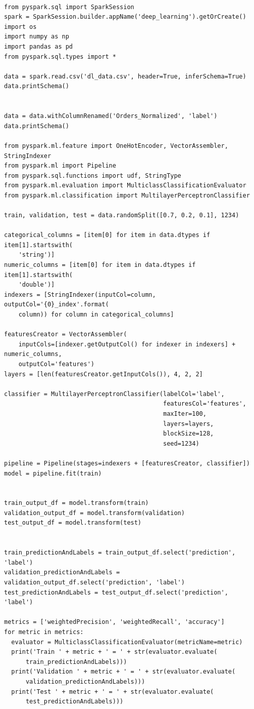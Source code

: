 \documentclass{article}
\begin{document}
\begin{lstlisting}

from pyspark.sql import SparkSession
spark = SparkSession.builder.appName('deep_learning').getOrCreate()
import os
import numpy as np
import pandas as pd
from pyspark.sql.types import *

data = spark.read.csv('dl_data.csv', header=True, inferSchema=True)
data.printSchema()


data = data.withColumnRenamed('Orders_Normalized', 'label')
data.printSchema()

from pyspark.ml.feature import OneHotEncoder, VectorAssembler, StringIndexer
from pyspark.ml import Pipeline
from pyspark.sql.functions import udf, StringType
from pyspark.ml.evaluation import MulticlassClassificationEvaluator
from pyspark.ml.classification import MultilayerPerceptronClassifier

train, validation, test = data.randomSplit([0.7, 0.2, 0.1], 1234)

categorical_columns = [item[0] for item in data.dtypes if item[1].startswith(
    'string')]
numeric_columns = [item[0] for item in data.dtypes if item[1].startswith(
    'double')]
indexers = [StringIndexer(inputCol=column, outputCol='{0}_index'.format(
    column)) for column in categorical_columns]

featuresCreator = VectorAssembler(
    inputCols=[indexer.getOutputCol() for indexer in indexers] + numeric_columns,
    outputCol='features')
layers = [len(featuresCreator.getInputCols()), 4, 2, 2]

classifier = MultilayerPerceptronClassifier(labelCol='label',
                                            featuresCol='features',
                                            maxIter=100,
                                            layers=layers,
                                            blockSize=128,
                                            seed=1234)

pipeline = Pipeline(stages=indexers + [featuresCreator, classifier])
model = pipeline.fit(train)


train_output_df = model.transform(train)
validation_output_df = model.transform(validation)
test_output_df = model.transform(test)


train_predictionAndLabels = train_output_df.select('prediction', 'label')
validation_predictionAndLabels = validation_output_df.select('prediction', 'label')
test_predictionAndLabels = test_output_df.select('prediction', 'label')

metrics = ['weightedPrecision', 'weightedRecall', 'accuracy']
for metric in metrics:
  evaluator = MulticlassClassificationEvaluator(metricName=metric)
  print('Train ' + metric + ' = ' + str(evaluator.evaluate(
      train_predictionAndLabels)))
  print('Validation ' + metric + ' = ' + str(evaluator.evaluate(
      validation_predictionAndLabels)))
  print('Test ' + metric + ' = ' + str(evaluator.evaluate(
      test_predictionAndLabels)))
\end{lstlisting}
\end{document}
